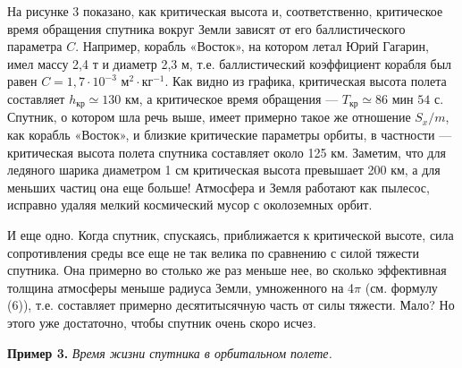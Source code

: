 \begin{multicols}{3}
На рисунке 3 показано, как критическая высота и, соответственно, критическое время обращения спутника вокруг Земли зависят от его баллистического параметра $C$. Например, корабль «Восток», на котором летал Юрий Гагарин, имел массу 2,4 т и диаметр 2,3 м, т.е. баллистический коэффициент корабля был равен $C=1,7\cdot10^{-3}$ м$^2\cdot$кг$^{-1}$. Как видно из графика, критическая высота полета составляет $h_\textit{кр}\simeq130$ км, а критическое время обращения — $T_\textit{кр}\simeq 86$ мин $54$ с. Спутник, о котором шла речь выше, имеет примерно такое же отношение $S_x/m$, как корабль «Восток», и близкие критические параметры орбиты, в частности — критическая высота полета спутника составляет около 125 км. Заметим, что для ледяного шарика диаметром 1 см критическая высота превышает 200 км, а для меньших частиц она еще больше! Атмосфера и Земля работают как пылесос, исправно удаляя мелкий космический мусор с околоземных орбит. 

И еще одно. Когда спутник, спускаясь, приближается к критической высоте, сила сопротивления среды все еще не так велика по сравнению с силой тяжести спутника. Она примерно во столько же раз меньше нее, во сколько эффективная толщина атмосферы меныше радиуса Земли, умноженного на 4$\pi$ (см. формулу (6)), т.е. составляет примерно десятитысячную часть от силы тяжести. Мало? Но этого уже достаточно, чтобы спутник очень скоро исчез.

\textbf{Пример 3.} \textit{Время жизни спутника в орбитальном полете.}


\end{multicols}
